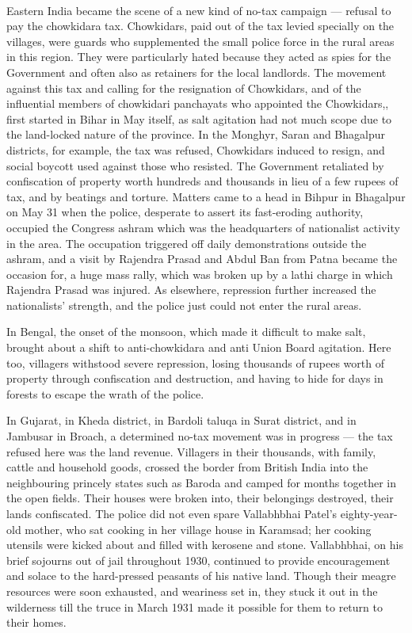 \paragraph*{}
Eastern India became the scene of a new kind of no-tax campaign — refusal to pay the chowkidara tax. Chowkidars, paid out of the tax levied specially on the villages, were guards who supplemented the small police force in the rural areas in this region. They were particularly hated because they acted as spies for the Government and often also as retainers for the local landlords. The movement against this tax and calling for the resignation of Chowkidars, and of the influential members of chowkidari panchayats who appointed the Chowkidars,, first started in Bihar in May itself, as salt agitation had not much scope due to the land-locked nature of the province. In the Monghyr, Saran and Bhagalpur districts, for example, the tax was refused, Chowkidars induced to resign, and social boycott used against those who resisted. The Government retaliated by confiscation of property worth hundreds and thousands in lieu of a few rupees of tax, and by beatings and torture. Matters came to a head in Bihpur in Bhagalpur on May 31 when the police, desperate to assert its fast-eroding authority, occupied the Congress ashram which was the headquarters of nationalist activity in the area. The occupation triggered off daily demonstrations outside the ashram, and a visit by Rajendra Prasad and Abdul Ban from Patna became the occasion for, a huge mass rally, which was broken up by a lathi charge in which Rajendra Prasad was injured. As elsewhere, repression further increased the nationalists' strength, and the police just could not enter the rural areas. 

In Bengal, the onset of the monsoon, which made it difficult to make salt, brought about a shift to anti-chowkidara and anti­ Union Board agitation. Here too, villagers withstood severe repression, losing thousands of rupees worth of property through confiscation and destruction, and having to hide for days in forests to escape the wrath of the police. 

In Gujarat, in Kheda district, in Bardoli taluqa in Surat district, and in Jambusar in Broach, a determined no-tax movement was in progress — the tax refused here was the land revenue. Villagers in their thousands, with family, cattle and household goods, crossed the border from British India into the neighbouring princely states such as Baroda and camped for months together in the open fields. Their houses were broken into, their belongings destroyed, their lands confiscated. The police did not even spare Vallabhbhai Patel's eighty-year-old mother, who sat cooking in her village house in Karamsad; her cooking utensils were kicked about and filled with kerosene and stone. Vallabhbhai, on his brief sojourns out of jail throughout 1930, continued to provide encouragement and solace to the hard-pressed peasants of his native land. Though their meagre resources were soon exhausted, and weariness set in, they stuck it out in the wilderness till the truce in March 1931 made it possible for them to return to their homes. 

